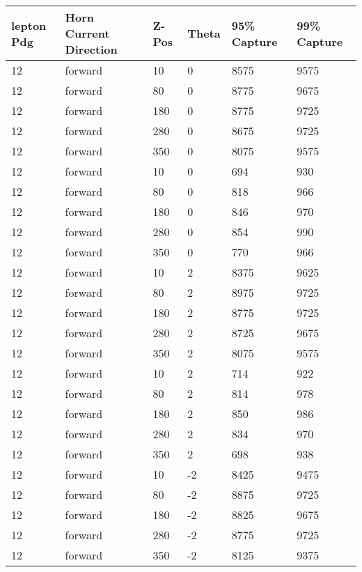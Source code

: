 \begin{table}
	\begin{center}
		\begin{tabular}{|l|l|l|l|l|l|}
			\hline
			lepton Pdg & Horn Current Direction & Z-Pos & Theta & 95\% Capture & 99\% Capture \\
			\hline
			12 & forward & 10 & 0 & 8575 & 9575 \\
			\hline
			12 & forward & 80 & 0 & 8775 & 9675 \\
			\hline
			12 & forward & 180 & 0 & 8775 & 9725 \\
			\hline
			12 & forward & 280 & 0 & 8675 & 9725 \\
			\hline
			12 & forward & 350 & 0 & 8075 & 9575 \\
			\hline
			12 & forward & 10 & 0 & 694 & 930 \\
			\hline
			12 & forward & 80 & 0 & 818 & 966 \\
			\hline
			12 & forward & 180 & 0 & 846 & 970 \\
			\hline
			12 & forward & 280 & 0 & 854 & 990 \\
			\hline
			12 & forward & 350 & 0 & 770 & 966 \\
			\hline
			12 & forward & 10 & 2 & 8375 & 9625 \\
			\hline
			12 & forward & 80 & 2 & 8975 & 9725 \\
			\hline
			12 & forward & 180 & 2 & 8775 & 9725 \\
			\hline
			12 & forward & 280 & 2 & 8725 & 9675 \\
			\hline
			12 & forward & 350 & 2 & 8075 & 9575 \\
			\hline
			12 & forward & 10 & 2 & 714 & 922 \\
			\hline
			12 & forward & 80 & 2 & 814 & 978 \\
			\hline
			12 & forward & 180 & 2 & 850 & 986 \\
			\hline
			12 & forward & 280 & 2 & 834 & 970 \\
			\hline
			12 & forward & 350 & 2 & 698 & 938 \\
			\hline
			12 & forward & 10 & -2 & 8425 & 9475 \\
			\hline
			12 & forward & 80 & -2 & 8875 & 9725 \\
			\hline
			12 & forward & 180 & -2 & 8825 & 9675 \\
			\hline
			12 & forward & 280 & -2 & 8775 & 9725 \\
			\hline
			12 & forward & 350 & -2 & 8125 & 9375 \\

\end{tabular}
\end{center}
\end{table}
